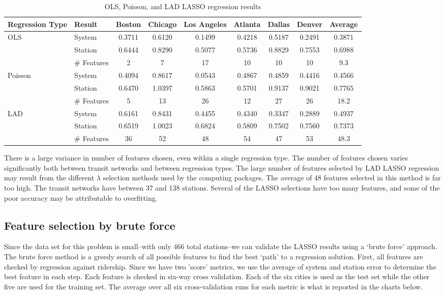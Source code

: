 \documentclass[11pt]{article}
\begin{document}
\begin{table}
\centering
\begingroup\fontsize{10}{15}\selectfont
\begin{tabular}{llccccccc}
\toprule
Regression Type&Result&Boston&Chicago&Los Angeles&Atlanta&Dallas&Denver&Average\\
\midrule
OLS&System&0.3711&0.6120&0.1499&0.4218&0.5187&0.2491&0.3871\\
&Station&0.6444&0.8290&0.5077&0.5736&0.8829&0.7553&0.6988\\
&\# Features&2&7&17&10&10&10&9.3\\
\midrule
Poisson&System&0.4094&0.8617&0.0543&0.4867&0.4859&0.4416&0.4566\\
&Station&0.6470&1.0397&0.5863&0.5701&0.9137&0.9021&0.7765\\
&\# Features&5&13&26&12&27&26&18.2\\
\midrule
LAD&System&0.6161&0.8431&0.4455&0.4340&0.3347&0.2889&0.4937\\
&Station&0.6519&1.0023&0.6824&0.5809&0.7502&0.7560&0.7373\\
&\# Features&36&52&48&54&47&53&48.3\\
\end{tabular}
\caption{OLS, Poisson, and LAD LASSO regression results}\label{tab:lasso}
\endgroup
\end{table}


There is a large variance in number of features chosen, even within a single regression type. The number of features chosen varies significantly both between transit networks and between regression types. The large number of features selected by LAD LASSO regression may result from the different $\lambda$ selection methods used by the computing packages. The average of 48 features selected in this method is far too high. The transit networks have between 37 and 138 stations. Several of the LASSO selections have too many features, and some of the poor accuracy may be attributable to overfitting.



\subsection{Feature selection by brute force}



Since the data set for this problem is small--with only 466 total stations--we can validate the LASSO results using a `brute force' approach. The brute force method is a greedy search of all possible features to find the best `path' to a regression solution. First, all features are checked by regression against ridership. Since we have two 'score' metrics, we use the average of system and station error to determine the best feature in each step. Each feature is checked in six-way cross validation. Each of the six cities is used as the test set while the other five are used for the training set. The average over all six cross-validation runs for each metric is what is reported in the charts below. 
\end{document}
